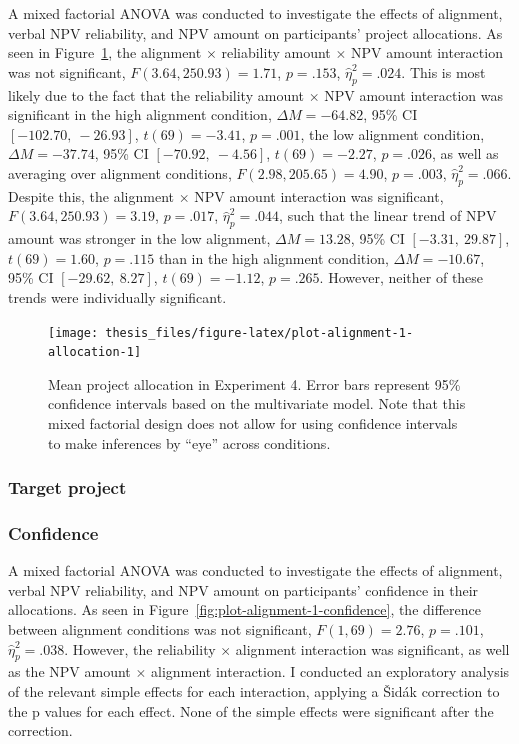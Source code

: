 \documentclass[a4paper, nobind, dvipsnames]{templates/ociamthesis}
\theoremstyle{definition}
\theoremstyle{definition}
\theoremstyle{definition}
\theoremstyle{definition}
\theoremstyle{remark}
\begin{document}
A mixed factorial ANOVA was conducted to investigate the effects of alignment,
verbal NPV reliability, and NPV amount on participants' project allocations. As
seen in Figure~\ref{fig:plot-alignment-1-allocation}, the alignment \(\times\)
reliability amount \(\times\) NPV amount interaction was not significant,
\(F(3.64, 250.93) = 1.71\), \(p = .153\), \(\hat{\eta}^2_p = .024\). This
is most likely due to the fact that the reliability amount \(\times\) NPV amount
interaction was significant in the high alignment condition,
\(\Delta M = -64.82\), 95\% CI \([-102.70,~-26.93]\), \(t(69) = -3.41\), \(p = .001\), the low alignment
condition, \(\Delta M = -37.74\), 95\% CI \([-70.92,~-4.56]\), \(t(69) = -2.27\), \(p = .026\), as well as
averaging over alignment conditions,
\(F(2.98, 205.65) = 4.90\), \(p = .003\), \(\hat{\eta}^2_p = .066\). Despite this,
the alignment \(\times\) NPV amount interaction was significant,
\(F(3.64, 250.93) = 3.19\), \(p = .017\), \(\hat{\eta}^2_p = .044\), such that the linear
trend of NPV amount was stronger in the low alignment,
\(\Delta M = 13.28\), 95\% CI \([-3.31,~29.87]\), \(t(69) = 1.60\), \(p = .115\) than in the high alignment
condition, \(\Delta M = -10.67\), 95\% CI \([-29.62,~8.27]\), \(t(69) = -1.12\), \(p = .265\). However, neither of
these trends were individually significant.



\begin{figure}
\texttt{[image: thesis\_files/figure-latex/plot-alignment-1-allocation-1]} \caption{Mean project allocation in Experiment 4. Error bars represent 95\% confidence intervals based on the multivariate model. Note that this mixed factorial design does not allow for using confidence intervals to make inferences by ``eye'' across conditions.}\label{fig:plot-alignment-1-allocation}
\end{figure}

\hypertarget{target-project}{%
\subsubsection{Target project}\label{target-project}}

\hypertarget{confidence-2}{%
\subsubsection{Confidence}\label{confidence-2}}

A mixed factorial ANOVA was conducted to investigate the effects of alignment,
verbal NPV reliability, and NPV amount on participants' confidence in their
allocations. As seen in Figure~\ref{fig:plot-alignment-1-confidence}, the
difference between alignment conditions was not significant,
\(F(1, 69) = 2.76\), \(p = .101\), \(\hat{\eta}^2_p = .038\). However, the reliability \(\times\)
alignment interaction was significant, as well as the NPV amount \(\times\)
alignment interaction. I conducted an exploratory analysis of the relevant
simple effects for each interaction, applying a Šidák correction to the p values
for each effect. None of the simple effects were significant after the
correction.
\end{document}
